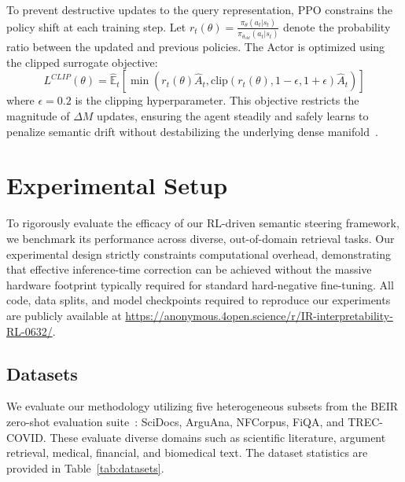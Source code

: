To prevent destructive updates to the query representation, PPO constrains the policy shift at each training step. Let $r_t(\theta) = \frac{\pi_\theta(a_t|s_t)}{\pi_{\theta_{old}}(a_t|s_t)}$ denote the probability ratio between the updated and previous policies. The Actor is optimized using the clipped surrogate objective:
\begin{equation}
L^{CLIP}(\theta) = \hat{\mathbb{E}}_t \left[ \min(r_t(\theta)\hat{A}_t, \text{clip}(r_t(\theta), 1-\epsilon, 1+\epsilon)\hat{A}_t) \right]
\end{equation}
where $\epsilon = 0.2$ is the clipping hyperparameter. This objective restricts the magnitude of $\Delta M$ updates, ensuring the agent steadily and safely learns to penalize semantic drift without destabilizing the underlying dense manifold~\citep{engstrom2020}.

\section{Experimental Setup}
To rigorously evaluate the efficacy of our RL-driven semantic steering framework, we benchmark its performance across diverse, out-of-domain retrieval tasks. Our experimental design strictly constraints computational overhead, demonstrating that effective inference-time correction can be achieved without the massive hardware footprint typically required for standard hard-negative fine-tuning. All code, data splits, and model checkpoints required to reproduce our experiments are publicly available at \url{https://anonymous.4open.science/r/IR-interpretability-RL-0632/}.

\subsection{Datasets}
We evaluate our methodology utilizing five heterogeneous subsets from the BEIR zero-shot evaluation suite~\citep{thakur2021}: SciDocs, ArguAna, NFCorpus, FiQA, and TREC-COVID. These evaluate diverse domains such as scientific literature, argument retrieval, medical, financial, and biomedical text. The dataset statistics are provided in Table~\ref{tab:datasets}.

